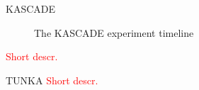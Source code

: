 \documentclass[18pt]{beamer}
\begin{document}
\begin{frame}{KASCADE}
    \begin{figure}[h]
    \caption{\small The KASCADE experiment timeline}
    \label{ris:image}
    \end{figure}
\textcolor{red}{Short descr.}
\end{frame}

\begin{frame}{TUNKA}
\textcolor{red}{Short descr.}
\end{frame}
\end{document}
